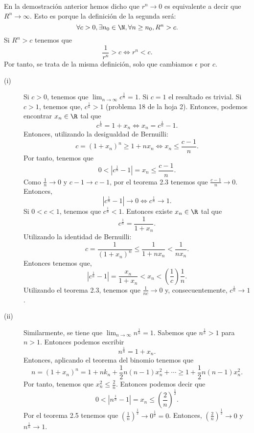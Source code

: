 \begin{observation}
\normalfont En la demostración anterior hemos dicho que $\displaystyle r^{n} \to 0 $ es equivalente a decir que $\displaystyle R^{n} \to \infty $. Esto es porque la definición de la segunda será:
\[\forall c > 0, \exists n_{0}\in\N, \forall n \geq n_{0}, R^{n} > c .\]
Si $\displaystyle R^{n} > c $ tenemos que 
\[\frac{1}{r^{n}} > c \iff r^{n} < c .\]
Por tanto, se trata de la misma definición, solo que cambiamos $\displaystyle \epsilon  $  por $\displaystyle c $.
\end{observation}

\begin{eg}
\normalfont 
\begin{description}
\item[(i)] Si $\displaystyle c > 0 $, tenemos que $\displaystyle \lim_{n \to \infty}c^{\frac{1}{n}}=1 $. Si $\displaystyle c = 1 $ el resultado es trivial. Si $\displaystyle c > 1 $, tenemos que, $\displaystyle c^{\frac{1}{n}} > 1 $ (problema 18 de la hoja 2). Entonces, podemos encontrar $\displaystyle x_{n} \in \R $ tal que 
	\[ c^{\frac{1}{n}} = 1 + x_{n} \iff x_{n} = c^{\frac{1}{n}}-1 .\]
Entonces, utilizando la desigualdad de Bernuilli:
\[c = \left(1 + x_{n}\right)^{n} \geq 1 + nx_{n} \iff x_{n} \leq \frac{c-1}{n} .\]
Por tanto, tenemos que
\[ 0 < \left|c^{\frac{1}{n}}-1\right| = x_{n} \leq \frac{c-1}{n} .\]
Como $\displaystyle \frac{1}{n} \to 0 $ y $\displaystyle c-1 \to c-1 $, por el teorema 2.3 tenemos que $\displaystyle \frac{c-1}{n} \to 0 $. Entonces, 
\[ \left|c^{\frac{1}{n}}-1\right| \to 0 \iff c^{\frac{1}{n}} \to 1 .\]
Si $\displaystyle 0 < c < 1 $, tenemos que $\displaystyle c^{\frac{1}{n}} < 1 $. Entonces existe $\displaystyle x_{n} \in \R $ tal que 
\[ c^{\frac{1}{n}} = \frac{1}{1 + x_{n}} .\]
Utilizando la identidad de Bernuilli:
\[ c = \frac{1}{\left(1 + x_{n}\right)^{n}} \leq \frac{1}{1 + nx_{n}} < \frac{1}{nx_{n}} .\]
Entonces tenemos que, 
\[ \left|c^{\frac{1}{n}}-1\right| = \frac{x_{n}}{1 + x_{n}} < x_{n} < \left(\frac{1}{c}\right)\frac{1}{n} .\]
Utilizando el teorema 2.3, tenemos que $\displaystyle \frac{1}{nc} \to 0 $ y, consecuentemente, $\displaystyle c^{\frac{1}{n}} \to 1 $.
\item[(ii)] Similarmente, se tiene que $\displaystyle \lim_{n \to \infty}n^{\frac{1}{n}} = 1 $. Sabemos que $\displaystyle n^{\frac{1}{n}} > 1 $ para $\displaystyle n > 1 $. Entonces podemos escribir
	\[n^{\frac{1}{n}} = 1 + x_{n} .\]
Entonces, aplicando el teorema del binomio tenemos que 
\[n = \left(1 + x_{n}\right)^{n} = 1 + nk_{n}+\frac{1}{2}n\left(n-1\right)x_{n}^{2} + \cdots \geq 1 + \frac{1}{2}n\left(n-1\right)x_{n}^{2} .\]
Por tanto, tenemos que $\displaystyle x_{n}^{2} \leq \frac{2}{n} $. Entonces podemos decir que
\[ 0 < \left|n^{\frac{1}{n}}-1\right| = x_{n} \leq \left(\frac{2}{n}\right)^{\frac{1}{2}} .\]
Por el teorema 2.5 tenemos que $\displaystyle \left(\frac{1}{n}\right)^{\frac{1}{2}} \to 0^{\frac{1}{2}} = 0 $. Entonces, $\displaystyle \left(\frac{2}{n}\right)^{\frac{1}{2}} \to 0 $ y $\displaystyle n^{\frac{1}{n}} \to 1 $.
\end{description}
\end{eg}


